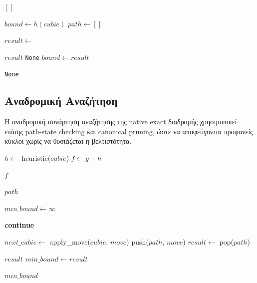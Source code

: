 \begin{algorithm}[H]
\caption{IDA* για Rubik's Cube}
\begin{algorithmic}[1]
        \State \Return $[]$
    \EndIf

    \State $bound \gets h(cubie)$
    \State $path \gets []$

        \State $result \gets$ 

            \State \Return $result$ 
            \State \Return \texttt{None} 
        \Else
            \State $bound \gets result$ 
        \EndIf
    \EndWhile

    \State \Return \texttt{None}
\EndFunction
\end{algorithmic}
\end{algorithm}

\subsection{Αναδρομική Αναζήτηση}

Η αναδρομική συνάρτηση αναζήτησης της native exact διαδρομής χρησιμοποιεί επίσης
path-state checking και canonical pruning, ώστε να αποφεύγονται προφανείς
κύκλοι χωρίς να θυσιάζεται η βελτιστότητα.

\begin{algorithm}[H]
\caption{Αναδρομική Αναζήτηση IDA*}
\begin{algorithmic}[1]
    \State $h \gets$ heuristic($cubie$)
    \State $f \gets g + h$

        \State \Return $f$ 
    \EndIf

        \State \Return $path$ 
    \EndIf

    \State $min\_bound \gets \infty$

            \State \textbf{continue}
        \EndIf

        \State $next\_cubie \gets$ apply\_move($cubie$, $move$)
        \State push($path$, $move$)
        \State $result \gets$ 
        \State pop($path$)

            \State \Return $result$
            \State $min\_bound \gets result$
        \EndIf
    \EndFor

    \State \Return $min\_bound$
\EndFunction
\end{algorithmic}
\end{algorithm}

